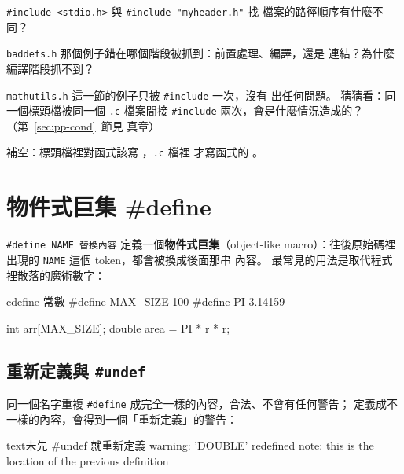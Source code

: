 
\begin{drills}[label=drills:pp-include]
\item \texttt{\#include <stdio.h>} 與 \texttt{\#include "myheader.h"} 找
檔案的路徑順序有什麼不同？
\item \texttt{baddefs.h} 那個例子錯在哪個階段被抓到：前置處理、編譯，還是
連結？為什麼編譯階段抓不到？
\item \texttt{mathutils.h} 這一節的例子只被 \texttt{\#include} 一次，沒有
出任何問題。 猜猜看：同一個標頭檔被同一個 \texttt{.c} 檔案間接
\texttt{\#include} 兩次，會是什麼情況造成的？（第~\ref{sec:pp-cond}~節見
真章）
\item 補空：標頭檔裡對函式該寫 \underline{\hspace{2em}}，\texttt{.c} 檔裡
才寫函式的 \underline{\hspace{2em}}。
\end{drills}

\section{物件式巨集 \#define}
\label{sec:pp-define}

\texttt{\#define NAME 替換內容} 定義一個\textbf{物件式巨集}（object-like
macro）：往後原始碼裡出現的 \texttt{NAME} 這個 token，都會被換成後面那串
內容。 最常見的用法是取代程式裡散落的魔術數字：

\begin{code}{c}{define 常數}
#define MAX_SIZE 100
#define PI 3.14159

int arr[MAX_SIZE];
double area = PI * r * r;
\end{code}

\subsection{重新定義與 \texttt{\#undef}}

同一個名字重複 \texttt{\#define} 成完全一樣的內容，合法、不會有任何警告；
定義成不一樣的內容，會得到一個「重新定義」的警告：

\begin{code}{text}{未先 \#undef 就重新定義}
warning: 'DOUBLE' redefined
note: this is the location of the previous definition
\end{code}

